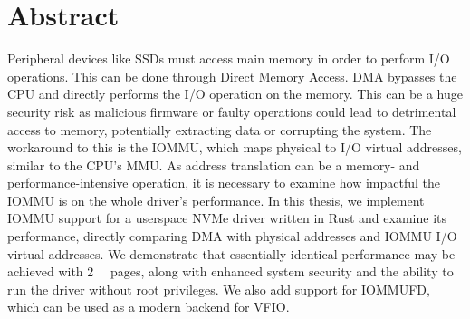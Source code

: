 \chapter{Abstract}

Peripheral devices like SSDs must access main memory in order to perform I/O operations. This can be done through Direct Memory Access. DMA bypasses the CPU and directly performs the I/O operation on the memory. This can be a huge security risk as malicious firmware or faulty operations could lead to detrimental access to memory, potentially extracting data or corrupting the system. The workaround to this is the IOMMU, which maps physical to I/O virtual addresses, similar to the CPU's MMU. As address translation can be a memory- and performance-intensive operation, it is necessary to examine how impactful the IOMMU is on the whole driver's performance.
In this thesis, we implement IOMMU support for a userspace NVMe driver written in Rust and examine its performance, directly comparing DMA with physical addresses and IOMMU I/O virtual addresses. We demonstrate that essentially identical performance may be achieved with \qty{2}{\mebi\byte} pages, along with enhanced system security and the ability to run the driver without root privileges. We also add support for IOMMUFD, which can be used as a modern backend for VFIO.